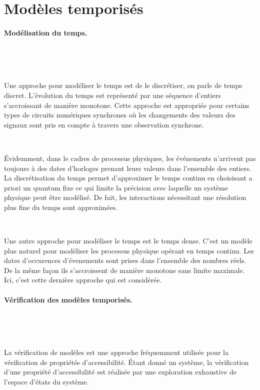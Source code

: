   \section{Modèles temporisés}
  \label{sec:modeles-temp}

    \paragraph{Modélisation du temps.} ~
    
      ~

      Une approche pour modéliser le temps est de le discrétiser, on parle de
      temps discret. L'évolution du temps est représenté par une séquence
      d'entiers s'accroissant de manière monotone. Cette approche est appropriée
      pour certains types de circuits numériques synchrones où les changements
      des valeurs des signaux sont pris en compte à travers une observation
      synchrone.

      ~

      Évidemment, dans le cadres de processus physiques, les événements
      n'arrivent pas toujours à des dates d'horloges prenant leurs valeurs dans
      l'ensemble des entiers. La discrétisation du temps permet d'approximer le
      temps continu en choisisant a priori un quantum fixe ce qui limite la
      précision avec laquelle un système physique peut être modélisé. De fait,
      les interactions nécessitant une résolution plus fine du temps sont
      approximées.

      ~

      Une autre approche pour modéliser le temps est le temps dense. C'est un
      modèle plus naturel pour modéliser les processus physique opérant en temps
      continu. Les dates d'occurences d'évenements sont prises dans l'ensemble
      des nombres réels. De la même façon ils s'accroissent de manière
      monotone sans limite maximale. Ici, c'est cette dernière approche qui est
      considérée.

    \paragraph{Vérification des modèles temporisés.} ~

      ~

      La vérification de modèles est une approche fréquemment utilisée pour la
      vérification de propriétés d'accessibilité. Étant donné un système, la
      vérification d'une propriété d'accessibilité est réalisée par une
      exploration exhaustive de l'espace d'états du système.

